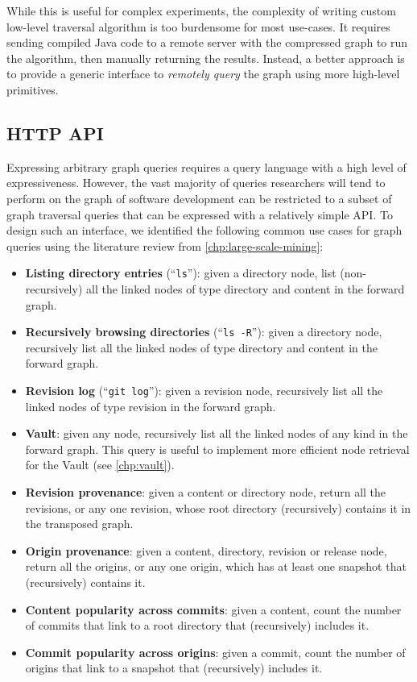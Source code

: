 While this is useful for complex experiments, the complexity of writing custom
low-level traversal algorithm is too burdensome for most use-cases. It
requires sending compiled Java code to a remote server with the compressed
graph to run the algorithm, then manually returning the results. Instead, a
better approach is to provide a generic interface to \emph{remotely query} the
graph using more high-level primitives.



\subsection{HTTP API}

Expressing arbitrary graph queries requires a query language with a high level
of expressiveness. However, the vast majority of queries researchers will tend
to perform on the graph of software development can be restricted to a subset
of graph traversal queries that can be expressed with a relatively simple
API\@. To design such an interface, we identified the following common use
cases for graph queries using the literature review from
\cref{chp:large-scale-mining}:

\begin{itemize}
    \item \textbf{Listing directory entries} (``\texttt{ls}''): given a
        directory node, list (non-recursively) all the linked nodes of type
        directory and content in the forward graph.
    \item \textbf{Recursively browsing directories} (``\texttt{ls -R}''): given
        a directory node, recursively list all the linked nodes of type
        directory and content in the forward graph.
    \item \textbf{Revision log} (``\texttt{git log}''): given
        a revision node, recursively list all the linked nodes of type
        revision in the forward graph.
    \item \textbf{Vault}: given any node, recursively list all the linked nodes
        of any kind in the forward graph. This query is useful to implement
        more efficient node retrieval for the Vault (see \cref{chp:vault}).
    \item \textbf{Revision provenance}: given a content or directory node,
        return all the revisions, or any one revision, whose root directory
        (recursively) contains it in the transposed graph.
    \item \textbf{Origin provenance}: given a content, directory, revision or
        release node, return all the origins, or any one origin, which has at
        least one snapshot that (recursively) contains it.
    \item \textbf{Content popularity across commits}: given a content, count
        the number of commits that link to a root directory that (recursively)
        includes it.
    \item \textbf{Commit popularity across origins}: given a commit, count
        the number of origins that link to a snapshot that (recursively)
        includes it.
\end{itemize}

